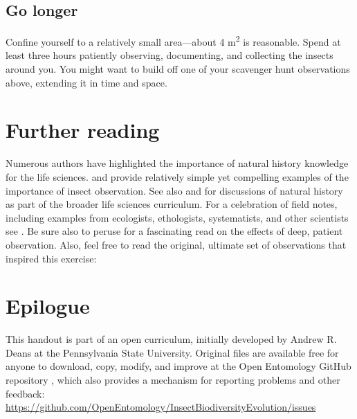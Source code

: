 \documentclass[letterpaper, 11pt]{article}
\begin{document}
\subsection*{Go longer}
Confine yourself to a relatively small area---about 4 m\textsuperscript{2} is reasonable. Spend at least three hours patiently observing, documenting, and collecting the insects around you. You might want to build off one of your scavenger hunt observations above, extending it in time and space.

\section*{Further reading}
Numerous authors have highlighted the importance of natural history knowledge for the life sciences. \cite{agrawal2014} and \cite{wilcoveeisner2000} provide relatively simple yet compelling examples of the importance of insect observation. See also \cite{Schmidly449} and \cite{Barrows13042016} for discussions of natural history as part of the broader life sciences curriculum. For a celebration of field notes, including examples from ecologists, ethologists, systematists, and other scientists see \cite{canfield2011field}. Be sure also to peruse \cite{roberts2013} for a fascinating read on the effects of deep, patient observation. Also, feel free to read the original, ultimate set of observations that inspired this exercise: \cite{Darwin1859}

\clearpage
\section*{Epilogue}
This handout is part of an open curriculum, initially developed by Andrew R. Deans at the Pennsylvania State University. Original files are available free for anyone to download, copy, modify, and improve at the Open Entomology GitHub repository \citep{ENT532}, which also provides a mechanism for reporting problems and other feedback:\\
\url{https://github.com/OpenEntomology/InsectBiodiversityEvolution/issues}



\end{document}
